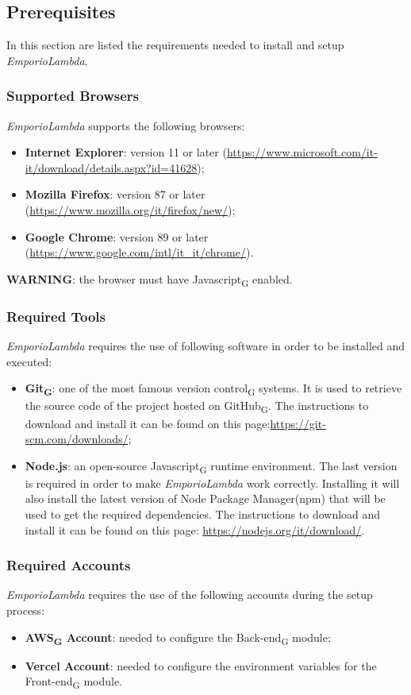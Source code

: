 \subsection{Prerequisites}
In this section are listed the requirements needed to install and setup \textit{EmporioLambda}.

\subsubsection{Supported Browsers}
\textit{EmporioLambda} supports the following browsers:
\begin{itemize}
\item \textbf{Internet Explorer}: version 11 or later (\url{https://www.microsoft.com/it-it/download/details.aspx?id=41628});
\item \textbf{Mozilla Firefox}: version 87 or later (\url{https://www.mozilla.org/it/firefox/new/});
\item \textbf{Google Chrome}: version 89 or later (\url{https://www.google.com/intl/it_it/chrome/}).
\end{itemize}
\textbf{WARNING}: the browser must have Javascript\textsubscript{G} enabled.

\subsubsection{Required Tools}
\textit{EmporioLambda} requires the use of following software in order to be installed and executed:
\begin{itemize}
\item \textbf{Git\textsubscript{G}}: one of the most famous version control\textsubscript{G} systems. It is used to retrieve the source code of the project hosted on GitHub\textsubscript{G}. The instructions to download and install it can be found on this page:\url{https://git-scm.com/downloads/};
\item \textbf{Node.js}: an open-source Javascript\textsubscript{G} runtime environment. The last version is required in order to make \textit{EmporioLambda} work correctly. Installing it will also install the latest version of Node Package Manager(npm) that will be used to get the required dependencies. The instructions to download and install it can be found on this page: \url{https://nodejs.org/it/download/}.
\end{itemize}

\subsubsection{Required Accounts}
\textit{EmporioLambda} requires the use of the following accounts during the setup process:
\begin{itemize}
\item \textbf{AWS\textsubscript{G} Account}: needed to configure the Back-end\textsubscript{G} module;
\item \textbf{Vercel Account}: needed to configure the environment variables for the Front-end\textsubscript{G} module.
\end{itemize}

